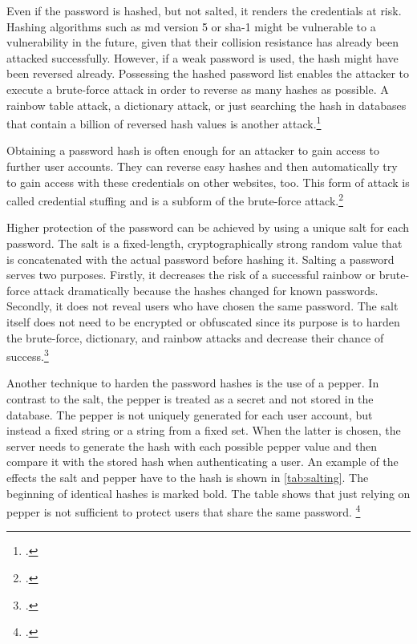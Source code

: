 Even if the password is hashed, but not salted, it renders the credentials at risk. Hashing algorithms such as \gls{md} version 5 or \gls{sha}-1 might be vulnerable to a vulnerability in the future, given that their collision resistance has already been attacked successfully. However, if a weak password is used, the hash might have been reversed already. Possessing the hashed password list enables the attacker to execute a brute-force attack in order to reverse as many hashes as possible. A rainbow table attack, a dictionary attack, or just searching the hash in databases that contain a billion of reversed hash values is another attack.\footcites[See][1425]{Thomas:2017:DBP:3133956.3134067}[See][427--430]{doi:10.1002/9781118256107.ch37}[See][56--57]{anderson2008security}

Obtaining a password hash is often enough for an attacker to gain access to further user accounts. They can reverse easy hashes and then automatically try to gain access with these credentials on other websites, too. This form of attack is called \frqq credential stuffing\flqq{} and is a subform of the brute-force attack.\footcites[See][]{troy-hunt-1}[See][1565]{48399}[See][Chapter 5.5]{zabicki2019practical}

Higher protection of the password can be achieved by using a unique \frqq salt\flqq{} for each password. The salt is a fixed-length, cryptographically strong random value that is concatenated with the actual password before hashing it. Salting a password serves two purposes. Firstly, it decreases the risk of a successful rainbow or brute-force attack dramatically because the hashes changed for known passwords. Secondly, it does not reveal users who have chosen the same password. The salt itself does not need to be encrypted or obfuscated since its purpose is to harden the brute-force, dictionary, and rainbow attacks and decrease their chance of success.\footcites[See][32--34]{IdentityandDataSecurityforWebDevelopment}[See][130--131]{brotherston2017defensive}[See][15]{SP80063B}

Another technique to harden the password hashes is the use of a \frqq pepper\flqq{}. In contrast to the salt, the pepper is treated as a secret and not stored in the database. The pepper is not uniquely generated for each user account, but instead a fixed string or a string from a fixed set. When the latter is chosen, the server needs to generate the hash with each possible pepper value and then compare it with the stored hash when authenticating a user. An example of the effects the salt and pepper have to the hash is shown in \autoref{tab:salting}. The beginning of identical hashes is marked bold. The table shows that just relying on pepper is not sufficient to protect users that share the same password. \footcites[See][33--35]{IdentityandDataSecurityforWebDevelopment}[See][15]{SP80063B}[See][173]{MANBER1996171}


